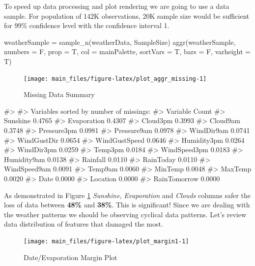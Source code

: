 To speed up data processing and plot rendering we are going to use a
data sample. For population of 142K observations, 20K sample size would
be sufficient for 99\% confidence level with the confidence interval 1.

\begin{Schunk}
\begin{Sinput}
weatherSample = sample_n(weatherData, SampleSize)
aggr(weatherSample, numbers = F, prop = T, col = mainPalette, sortVars = T, bars = F, varheight = T)
\end{Sinput}
\begin{figure}[H]

{\centering \texttt{[image: main\_files/figure-latex/plot\_aggr\_missing-1]} 

}

\caption[Missing Data Summary]{Missing Data Summary}\label{fig:plot_aggr_missing}
\end{figure}
\begin{Soutput}
#> 
#>  Variables sorted by number of missings: 
#>       Variable  Count
#>       Sunshine 0.4765
#>    Evaporation 0.4307
#>       Cloud3pm 0.3993
#>       Cloud9am 0.3748
#>    Pressure3pm 0.0981
#>    Pressure9am 0.0978
#>     WindDir9am 0.0741
#>    WindGustDir 0.0654
#>  WindGustSpeed 0.0646
#>    Humidity3pm 0.0264
#>     WindDir3pm 0.0259
#>        Temp3pm 0.0184
#>   WindSpeed3pm 0.0183
#>    Humidity9am 0.0138
#>       Rainfall 0.0110
#>      RainToday 0.0110
#>   WindSpeed9am 0.0091
#>        Temp9am 0.0060
#>        MinTemp 0.0048
#>        MaxTemp 0.0020
#>           Date 0.0000
#>       Location 0.0000
#>   RainTomorrow 0.0000
\end{Soutput}
\end{Schunk}

As demonstrated in Figure \ref{fig:plot_aggr_missing} \emph{Sunshine},
\emph{Evaporation} and \emph{Clouds} columns safer the loss of data
between \textbf{48\%} and \textbf{38\%}. This is significant! Since we
are dealing with the weather patterns we should be observing cyclical
data patterns. Let's review data distribution of features that damaged
the most.

\begin{Schunk}
\begin{figure}[H]

{\centering \texttt{[image: main\_files/figure-latex/plot\_margin1-1]} 

}

\caption[Date/Evaporation Margin Plot]{Date/Evaporation Margin Plot}\label{fig:plot_margin1}
\end{figure}
\end{Schunk}


